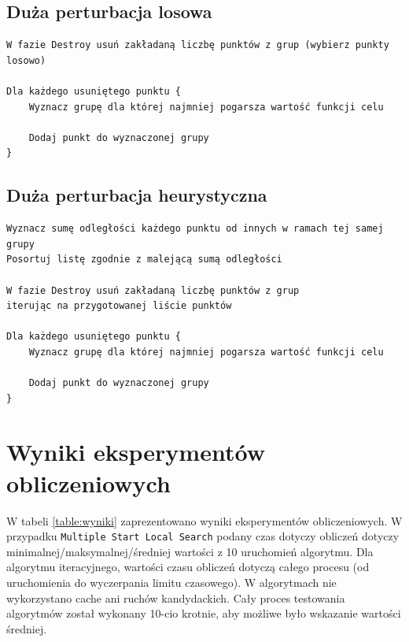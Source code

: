 \documentclass[main.tex]{subfiles}
\begin{document}
\subsection{Duża perturbacja losowa}
\begin{verbatim}
W fazie Destroy usuń zakładaną liczbę punktów z grup (wybierz punkty losowo)

Dla każdego usuniętego punktu {
    Wyznacz grupę dla której najmniej pogarsza wartość funkcji celu

    Dodaj punkt do wyznaczonej grupy
}
\end{verbatim}

\subsection{Duża perturbacja heurystyczna}
\begin{verbatim}
Wyznacz sumę odległości każdego punktu od innych w ramach tej samej grupy
Posortuj listę zgodnie z malejącą sumą odległości

W fazie Destroy usuń zakładaną liczbę punktów z grup
iterując na przygotowanej liście punktów

Dla każdego usuniętego punktu {
    Wyznacz grupę dla której najmniej pogarsza wartość funkcji celu

    Dodaj punkt do wyznaczonej grupy
}
\end{verbatim}

\section{Wyniki eksperymentów obliczeniowych}
\label{section:wyniki}

W tabeli \ref{table:wyniki} zaprezentowano wyniki eksperymentów obliczeniowych. W przypadku \texttt{Multiple Start Local Search} podany czas dotyczy obliczeń dotyczy minimalnej/maksymalnej/średniej wartości z 10 uruchomień algorytmu. Dla algorytmu iteracyjnego, wartości czasu obliczeń dotyczą całego procesu (od uruchomienia do wyczerpania limitu czasowego). W algorytmach nie wykorzystano cache ani ruchów kandydackich. Cały proces testowania algorytmów został wykonany 10-cio krotnie, aby możliwe było wskazanie wartości średniej.
\end{document}
